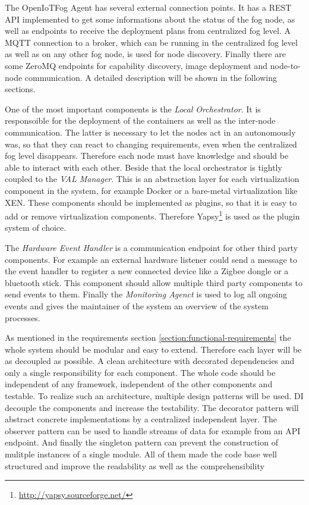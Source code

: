 The OpenIoTFog Agent has several external connection points.
It has a \ac{REST} \ac{API} implemented to get some informations about the status of the fog node, as well as endpoints to receive the deployment plans from centralized fog level.
A \ac{MQTT} connection to a broker, which can be running in the centralized fog level as well as on any other fog node, is used for node discovery.
Finally there are some ZeroMQ endpoints for capability discovery, image deployment and node-to-node communication.
A detailed description will be shown in the following sections.

One of the most important components is the \textit{Local Orchestrator}.
It is responsoible for the deployment of the containers as well as the inter-node communication.
The latter is necessary to let the nodes act in an autonomously was, so that they can react to changing requirements, even when the centralized fog level disappears.
Therefore each node must have knowledge and should be able to interact with each other.
Beside that the local orchestrator is tightly coupled to the \textit{\ac{VAL} Manager}.
This is an abstraction layer for each virtualization component in the system, for example Docker or a bare-metal virtualization like XEN.
These components should be implemented as plugins, so that it is easy to add or remove virtualization components.
Therefore Yapsy\footnote{\url{http://yapsy.sourceforge.net/}} is used as the plugin system of choice.

The \textit{Hardware Event Handler} is a communication endpoint for other third party components.
For example an external hardware listener could send a message to the event handler to register a new connected device like a Zigbee dongle or a bluetooth stick.
This component should allow multiple third party components to send events to them.
Finally the \textit{Monitoring Agenct} is used to log all ongoing events and gives the maintainer of the system an overview of the system processes.

As mentioned in the requirements section \ref{section:functional-requirements} the whole system should be modular and easy to extend.
Therefore each layer will be as decoupled as possible.
A clean architecture with decorated dependencies and only a single responsibility for each component.
The whole code should be independent of any framework, independent of the other components and testable.
To realize such an architecture, multiple design patterns will be used.
\ac{DI} decouple the components and increase the testability.
The decorator pattern will abstract concrete implementations by a centralized independent layer.
The observer pattern can be used to handle streams of data for example from an \ac{API} endpoint.
And finally the singleton pattern can prevent the construction of mulitple instances of a single module.
All of them made the code base well structured and improve the readability as well as the comprehensibility


